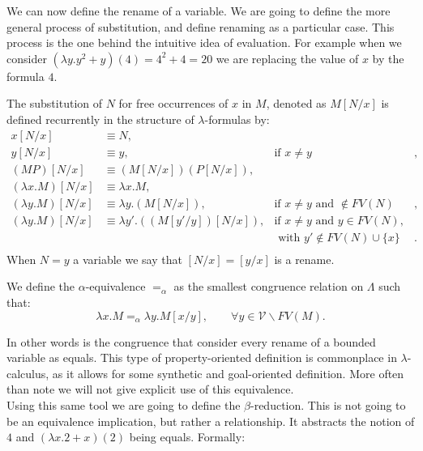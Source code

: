 We can now define the rename of a variable. We are  going to define the more general process of substitution, and define renaming as a particular case. This process is the one behind the intuitive idea of evaluation. For example when we consider $(\lambda y. y^2+y)(4) = 4^2+4 = 20$ we are replacing the value of $x$ by the formula $4$. 
\begin{definition}\label{def:substition}
  The substitution of $N$ for free occurrences of $x$ in $M$, denoted as $M[N/x]$ is defined recurrently in the structure of $\lambda$-formulas by:
  \begin{align*}
    x[N/x]& \equiv N,\\
    y[N/x]& \equiv y, &  \text{if } x\ne y&,\\
    (MP)[N/x]& \equiv (M[N/x])(P[N/x]),\\
    (\lambda x.M)[N/x] & \equiv \lambda x.M,\\
    (\lambda y.M)[N/x] & \equiv \lambda y.(M[N/x]), & \text{if } x\ne y \text{ and } \not \in FV(N)&,\\
    (\lambda y.M)[N/x] & \equiv \lambda y'.((M[y'/y])[N/x]), & \text{if } x\ne y \text{ and } y\in FV(N),\\
          & & \text{ with } y' \not \in FV(N) \cup \{x\}&.\\
  \end{align*}
  When $N = y$ a variable we say that $[N/x] = [y/x]$ is a rename. 
\end{definition}

\begin{definition}
  We define the $\alpha$-equivalence $=_\alpha$ as the smallest congruence relation on $\Lambda$ such that:
  $$\lambda x. M =_\alpha \lambda y. M[x/y], \qquad \forall y \in \mathcal{V} \backslash FV(M).$$
\end{definition}
In other words is the congruence that consider every rename of a bounded variable as equals. This type of property-oriented definition is commonplace in $\lambda$-calculus, as it allows for some synthetic and goal-oriented definition. More often than note we will not give explicit use of this equivalence.\\



Using this same tool we are going to define the $\beta$-reduction. This is not going to be an equivalence implication, but rather a relationship. It abstracts the notion of $4$ and $(\lambda x. 2+x)(2)$ being equals. Formally:

